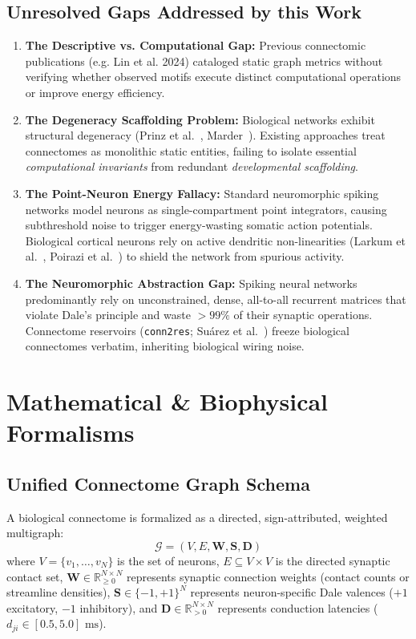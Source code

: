 \documentclass[11pt,letterpaper]{report}
\begin{document}
\section{Unresolved Gaps Addressed by this Work}
\begin{enumerate}[leftmargin=*]
    \item \textbf{The Descriptive vs. Computational Gap:} Previous connectomic publications (e.g. Lin et al. 2024) cataloged static graph metrics without verifying whether observed motifs execute distinct computational operations or improve energy efficiency.
    \item \textbf{The Degeneracy Scaffolding Problem:} Biological networks exhibit structural degeneracy (Prinz et al.~\cite{prinz2004similar}, Marder~\cite{marder2011variability}). Existing approaches treat connectomes as monolithic static entities, failing to isolate essential \textit{computational invariants} from redundant \textit{developmental scaffolding}.
    \item \textbf{The Point-Neuron Energy Fallacy:} Standard neuromorphic spiking networks model neurons as single-compartment point integrators, causing subthreshold noise to trigger energy-wasting somatic action potentials. Biological cortical neurons rely on active dendritic non-linearities (Larkum et al.~\cite{larkum1999new}, Poirazi et al.~\cite{poirazi2003pyramidal}) to shield the network from spurious activity.
    \item \textbf{The Neuromorphic Abstraction Gap:} Spiking neural networks predominantly rely on unconstrained, dense, all-to-all recurrent matrices that violate Dale's principle and waste $>99\%$ of their synaptic operations. Connectome reservoirs (\texttt{conn2res}; Su{\'a}rez et al.~\cite{suarez2024connectome}) freeze biological connectomes verbatim, inheriting biological wiring noise.
\end{enumerate}

\newpage

\chapter{Mathematical \& Biophysical Formalisms}

\section{Unified Connectome Graph Schema}
A biological connectome is formalized as a directed, sign-attributed, weighted multigraph:
\begin{equation}
\mathcal{G} = (V, E, \mathbf{W}, \mathbf{S}, \mathbf{D})
\end{equation}
where $V = \{v_1, \dots, v_N\}$ is the set of neurons, $E \subseteq V \times V$ is the directed synaptic contact set, $\mathbf{W} \in \mathbb{R}_{\ge 0}^{N \times N}$ represents synaptic connection weights (contact counts or streamline densities), $\mathbf{S} \in \{-1, +1\}^N$ represents neuron-specific Dale valences ($+1$ excitatory, $-1$ inhibitory), and $\mathbf{D} \in \mathbb{R}_{> 0}^{N \times N}$ represents conduction latencies ($d_{ji} \in [0.5, 5.0]\text{ ms}$).
\end{document}
